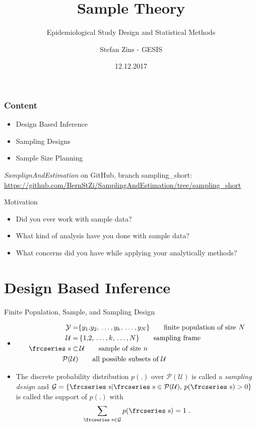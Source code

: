 \documentclass{beamer}\usepackage[]{graphicx}\usepackage[]{color}
\title{Sample Theory}
\subtitle{Epidemiological Study Design and Statistical Methods}
\author{Stefan Zins - GESIS}
\date{12.12.2017}
\newcommand{\eqname}[1]{\tag*{#1}} %
\newcommand{\textfrc}[1]{{\frcseries#1}}
\newcommand{\mathfrc}[1]{\text{\textfrc{#1}}}
\begin{document}
\gesismaketitle %

\begin{frame}%
  \frametitle{Content}
  
  \begin{itemize}
  \item Design Based Inference
  \item Sampling Designs
  \item Sample Size Planning
  \end{itemize}


\emph{SamplignAndEstimation} on GitHub, branch sampling\_short:
\url{https://github.com/BernStZi/SamplingAndEstimation/tree/sampling_short}
\end{frame}


\begin{frame}{Motivation}
 \begin{itemize}
    \item<1>  Did you ever work with sample data? 
    \item<2> What kind of analysis have you done with sample data?
    \item<3>  What concerns did you have while applying your analytically methods?
  \end{itemize}
\end{frame}



\section{Design Based Inference}



\begin{frame}{\alert{Finite} Population, Sample, and Sampling Design}

 \begin{itemize}
 \item[] 
 \begin{align}
 \mathcal{Y} = & \{ y_1{,}y_2{,}\,\ldots{,}\,y_k{,}\,\ldots{,}\,y_N \} \eqname{finite population of size $N$} \\
 \mathcal{U} = &\, \{ 1{,}2{,}\,\ldots{,}\,k{,}\,\ldots{,}\,N \} \eqname{sampling frame} \\
 \mathfrc{s} \subset &\, \mathcal{U} \eqname{sample of size $n$} \\
 \mathcal{P}(\mathcal{U}) & \eqname{all possible subsets of $\mathcal{U}$}
 \end{align}
 \item[] The discrete probability distribution $p(.)$ over $\mathcal{P}(\mathcal{U})$ is called a \emph{sampling design} and  $\mathcal{G}=\{ \mathfrc{s} | \mathfrc{s} \in \mathcal{P}(\mathcal{U}),\, p(\mathfrc{s}) > 0 \}$ is called the support of $p(.)$ with
$$
\sum_{\mathfrc{s} \in \mathcal{G}} p(\mathfrc{s}) = 1\;.
$$
 \end{itemize}
\end{frame}
\end{document}
